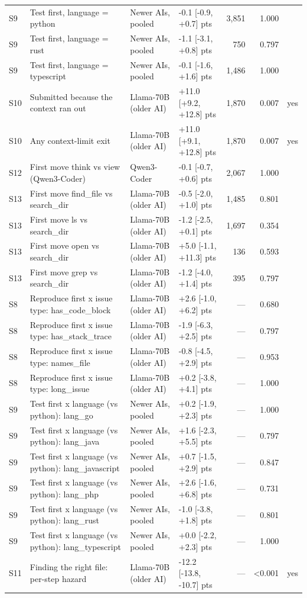 \begin{tabular}{llllrrl}
S9 & Test first, language = python & Newer AIs, pooled & -0.1 [-0.9, +0.7] pts & 3,851 & 1.000 &  \\
S9 & Test first, language = rust & Newer AIs, pooled & -1.1 [-3.1, +0.8] pts & 750 & 0.797 &  \\
S9 & Test first, language = typescript & Newer AIs, pooled & -0.1 [-1.6, +1.6] pts & 1,486 & 1.000 &  \\
S10 & Submitted because the context ran out & Llama-70B (older AI) & +11.0 [+9.2, +12.8] pts & 1,870 & 0.007 & yes \\
S10 & Any context-limit exit & Llama-70B (older AI) & +11.0 [+9.1, +12.8] pts & 1,870 & 0.007 & yes \\
S12 & First move think vs view (Qwen3-Coder) & Qwen3-Coder & -0.1 [-0.7, +0.6] pts & 2,067 & 1.000 &  \\
S13 & First move find\_file vs search\_dir & Llama-70B (older AI) & -0.5 [-2.0, +1.0] pts & 1,485 & 0.801 &  \\
S13 & First move ls vs search\_dir & Llama-70B (older AI) & -1.2 [-2.5, +0.1] pts & 1,697 & 0.354 &  \\
S13 & First move open vs search\_dir & Llama-70B (older AI) & +5.0 [-1.1, +11.3] pts & 136 & 0.593 &  \\
S13 & First move grep vs search\_dir & Llama-70B (older AI) & -1.2 [-4.0, +1.4] pts & 395 & 0.797 &  \\
S8 & Reproduce first x issue type: has\_code\_block & Llama-70B (older AI) & +2.6 [-1.0, +6.2] pts & — & 0.680 &  \\
S8 & Reproduce first x issue type: has\_stack\_trace & Llama-70B (older AI) & -1.9 [-6.3, +2.5] pts & — & 0.797 &  \\
S8 & Reproduce first x issue type: names\_file & Llama-70B (older AI) & -0.8 [-4.5, +2.9] pts & — & 0.953 &  \\
S8 & Reproduce first x issue type: long\_issue & Llama-70B (older AI) & +0.2 [-3.8, +4.1] pts & — & 1.000 &  \\
S9 & Test first x language (vs python): lang\_go & Newer AIs, pooled & +0.2 [-1.9, +2.3] pts & — & 1.000 &  \\
S9 & Test first x language (vs python): lang\_java & Newer AIs, pooled & +1.6 [-2.3, +5.5] pts & — & 0.797 &  \\
S9 & Test first x language (vs python): lang\_javascript & Newer AIs, pooled & +0.7 [-1.5, +2.9] pts & — & 0.847 &  \\
S9 & Test first x language (vs python): lang\_php & Newer AIs, pooled & +2.6 [-1.6, +6.8] pts & — & 0.731 &  \\
S9 & Test first x language (vs python): lang\_rust & Newer AIs, pooled & -1.0 [-3.8, +1.8] pts & — & 0.801 &  \\
S9 & Test first x language (vs python): lang\_typescript & Newer AIs, pooled & +0.0 [-2.2, +2.3] pts & — & 1.000 &  \\
S11 & Finding the right file: per-step hazard & Llama-70B (older AI) & -12.2 [-13.8, -10.7] pts & — & <0.001 & yes \\
\bottomrule
\end{tabular}
